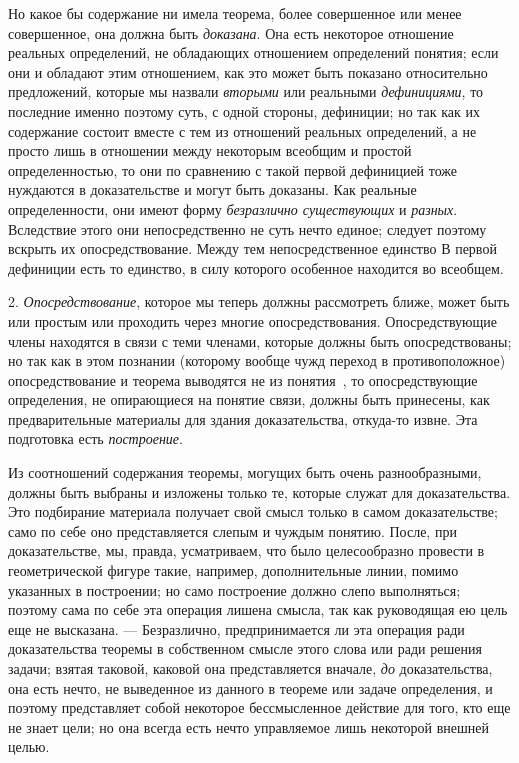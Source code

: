 \documentclass[twoside]{article}
\begin{document}
Но какое бы содержание ни имела теорема, более совершенное или
менее совершенное, она должна быть
{\em доказана}. Она есть
некоторое отношение реальных определений, не обладающих отношением
определений понятия; если они и обладают этим отношением, как это может
быть показано относительно предложений, которые мы назвали
{\em вторыми} или
реальными {\em дефинициями},
то последние именно поэтому суть, с одной стороны, дефиниции;
но так как их содержание состоит вместе с тем из отношений реальных
определений, а не просто лишь в отношении между некоторым всеобщим и
простой определенностью, то они по сравнению с такой первой дефиницией тоже
нуждаются в доказательстве и могут быть доказаны. Как реальные
определенности, они имеют форму
{\em безразлично существующих}
и {\em разных}.
Вследствие этого они непосредственно не суть нечто единое;
следует поэтому вскрыть их опосредствование. Между тем непосредственное
единство В первой дефиниции есть то единство, в силу которого особенное
находится во всеобщем.

2. {\em Опосредствование},
которое мы теперь должны рассмотреть ближе, может быть или
простым или проходить через многие опосредствования. Опосредствующие члены
находятся в связи с теми членами, которые должны быть опосредствованы; но
так как в этом познании (которому вообще чужд переход в противоположное)
опосредствование и теорема выводятся не из
понятия~\label{bkm:bm114},
то опосредствующие определения, не опирающиеся на понятие
связи, должны быть принесены, как предварительные материалы для здания
доказательства, откуда-то извне. Эта подготовка есть
{\em построение}.

Из соотношений содержания теоремы, могущих быть очень
разнообразными, должны быть выбраны и изложены только те, которые служат
для доказательства. Это подбирание материала получает свой смысл только в
самом доказательстве; само по себе оно представляется слепым и чуждым
понятию. После, при доказательстве, мы, правда, усматриваем, что было
целесообразно провести в геометрической фигуре такие, например, дополнительные
линии, помимо указанных в построении; но само построение должно слепо 
выполняться; поэтому сама по себе эта операция лишена смысла, так как
руководящая ею цель еще не высказана. — Безразлично,
предпринимается ли эта операция ради доказательства теоремы в собственном
смысле этого слова или ради решения задачи; взятая таковой, каковой она
представляется вначале, {\em до}
доказательства, она есть нечто, не выведенное из данного в
теореме или задаче определения, и поэтому представляет собой некоторое
бессмысленное действие для того, кто еще не знает цели; но она всегда есть
нечто управляемое лишь некоторой внешней целью.
\end{document}
